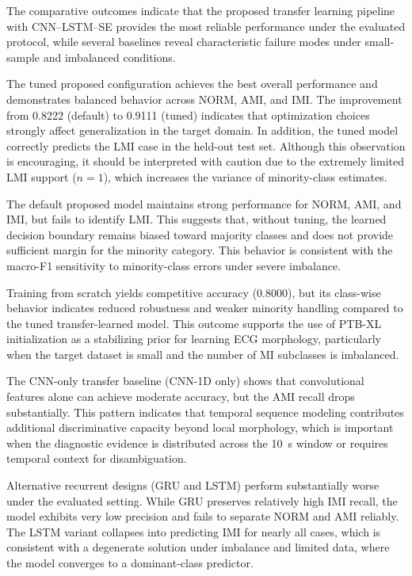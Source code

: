 \documentclass[preprint,12pt]{elsarticle}
\begin{document}
\begin{longtable}{p{4.9cm}c c c c c c}
\bottomrule
\end{longtable}



The comparative outcomes indicate that the proposed transfer learning pipeline with CNN--LSTM--SE provides the most reliable performance under the evaluated protocol, while several baselines reveal characteristic failure modes under small-sample and imbalanced conditions.


The tuned proposed configuration achieves the best overall performance and demonstrates balanced behavior across NORM, AMI, and IMI. The improvement from 0.8222 (default) to 0.9111 (tuned) indicates that optimization choices strongly affect generalization in the target domain. In addition, the tuned model correctly predicts the LMI case in the held-out test set. Although this observation is encouraging, it should be interpreted with caution due to the extremely limited LMI support ($n=1$), which increases the variance of minority-class estimates.

The default proposed model maintains strong performance for NORM, AMI, and IMI, but fails to identify LMI. This suggests that, without tuning, the learned decision boundary remains biased toward majority classes and does not provide sufficient margin for the minority category. This behavior is consistent with the macro-F1 sensitivity to minority-class errors under severe imbalance.

Training from scratch yields competitive accuracy (0.8000), but its class-wise behavior indicates reduced robustness and weaker minority handling compared to the tuned transfer-learned model. This outcome supports the use of PTB-XL initialization as a stabilizing prior for learning ECG morphology, particularly when the target dataset is small and the number of MI subclasses is imbalanced.

The CNN-only transfer baseline (CNN-1D only) shows that convolutional features alone can achieve moderate accuracy, but the AMI recall drops substantially. This pattern indicates that temporal sequence modeling contributes additional discriminative capacity beyond local morphology, which is important when the diagnostic evidence is distributed across the 10~s window or requires temporal context for disambiguation.

Alternative recurrent designs (GRU and LSTM) perform substantially worse under the evaluated setting. While GRU preserves relatively high IMI recall, the model exhibits very low precision and fails to separate NORM and AMI reliably. The LSTM variant collapses into predicting IMI for nearly all cases, which is consistent with a degenerate solution under imbalance and limited data, where the model converges to a dominant-class predictor.
\end{document}
